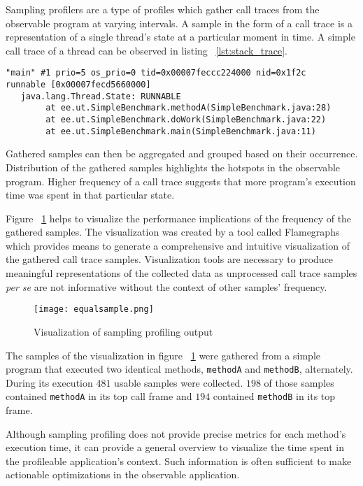\documentclass[..thesis.tex]{subfiles}
\begin{document}
Sampling profilers are a type of profiles which gather call traces from the observable program at varying intervals. A sample in the form of a call trace is a representation of a single thread's state at a particular moment in time. A simple call trace of a thread can be observed in listing ~\ref{lst:stack_trace}. 

\begin{lstlisting}[style=def,label={lst:stack_trace}, caption={Call trace of a thread}]
"main" #1 prio=5 os_prio=0 tid=0x00007feccc224000 nid=0x1f2c 
runnable [0x00007fecd5660000]
   java.lang.Thread.State: RUNNABLE
	    at ee.ut.SimpleBenchmark.methodA(SimpleBenchmark.java:28)
    	at ee.ut.SimpleBenchmark.doWork(SimpleBenchmark.java:22)
	    at ee.ut.SimpleBenchmark.main(SimpleBenchmark.java:11)
\end{lstlisting}

Gathered samples can then be aggregated and grouped based on their occurrence.
Distribution of the gathered samples highlights the hotspots in the observable program. Higher frequency of a call trace suggests that more program's execution time was spent in that particular state. 

Figure ~\ref{fig:samplingProf} helps to visualize the performance implications of the frequency of the gathered samples. The visualization was created by a tool called Flamegraphs which provides means to generate a comprehensive and intuitive visualization of the gathered call trace samples. \cite{gregg_flame} Visualization tools are necessary to produce meaningful representations of the collected data as unprocessed call trace samples \textit{per se} are not informative without the context of other samples' frequency.

\begin{figure}[H]
\texttt{[image: equalsample.png]}
\caption{Visualization of sampling profiling output}
\label{fig:samplingProf}
\end{figure}

The samples of the visualization in figure ~\ref{fig:samplingProf} were gathered from a simple program that executed two identical methods, \texttt{methodA} and \texttt{methodB}, alternately. During its execution $481$ usable samples were collected. $198$ of those samples contained \texttt{methodA} in its top call frame and $194$ contained \texttt{methodB} in its top frame.

Although sampling profiling does not provide precise metrics for each method's execution time, it can provide a general overview to visualize the time spent in the profileable application's context. Such information is often sufficient to make actionable optimizations in the observable application.
\end{document}
